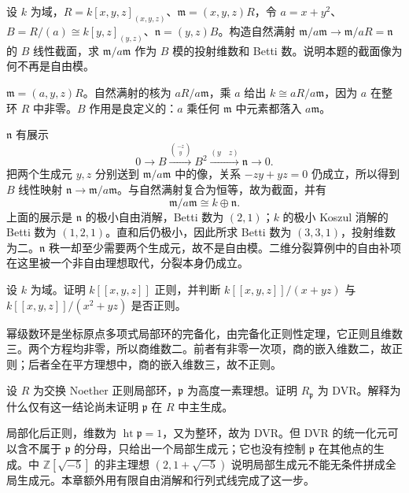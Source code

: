 \begin{exercise}\label{b3:ex:18-abs-splitting-concrete}
	设 \(k\) 为域，\(R=k[x,y,z]_{(x,y,z)}\)、\(\mathfrak m=(x,y,z)R\)，令 \(a=x+y^2\)、\(B=R/(a)\cong k[y,z]_{(y,z)}\)、\(\mathfrak n=(y,z)B\)。构造自然满射 \(\mathfrak m/a\mathfrak m\to\mathfrak m/aR=\mathfrak n\) 的 \(B\) 线性截面，求 \(\mathfrak m/a\mathfrak m\) 作为 \(B\) 模的投射维数和 Betti 数。说明本题的截面像为何不再是自由模。
\end{exercise}
\begin{solution}
	\(\mathfrak m=(a,y,z)R\)。自然满射的核为 \(aR/a\mathfrak m\)，乘 \(a\) 给出 \(k\cong aR/a\mathfrak m\)，因为 \(a\) 在整环 \(R\) 中非零。\(B\) 作用是良定义的：\(a\) 乘任何 \(\mathfrak m\) 中元素都落入 \(a\mathfrak m\)。

	\(\mathfrak n\) 有展示
	\[
		0\longrightarrow B\xrightarrow{\binom{-z}{y}}B^2 \xrightarrow{(y\quad z)}\mathfrak n\longrightarrow0.
	\]
	把两个生成元 \(y,z\) 分别送到 \(\mathfrak m/a\mathfrak m\) 中的像，关系 \(-zy+yz=0\) 仍成立，所以得到 \(B\) 线性映射 \(\mathfrak n\to\mathfrak m/a\mathfrak m\)。与自然满射复合为恒等，故为截面，并有
	\[
		\mathfrak m/a\mathfrak m\cong k\oplus\mathfrak n.
	\]
	上面的展示是 \(\mathfrak n\) 的极小自由消解，Betti 数为 \((2,1)\)；\(k\) 的极小 Koszul 消解的 Betti 数为 \((1,2,1)\)。直和后仍极小，因此所求 Betti 数为 \((3,3,1)\)，投射维数为二。\(\mathfrak n\) 秩一却至少需要两个生成元，故不是自由模。二维分裂算例中的自由补项在这里被一个非自由理想取代，分裂本身仍成立。
\end{solution}

\begin{exercise}\label{b3:ex:18-formal-regularity}
	设 \(k\) 为域。证明 \(k[\![x,y,z]\!]\) 正则，并判断 \(k[\![x,y,z]\!]/(x+yz)\) 与 \(k[\![x,y,z]\!]/(x^2+yz)\) 是否正则。
\end{exercise}
\begin{solution}
	幂级数环是坐标原点多项式局部环的完备化，由完备化正则性定理，它正则且维数三。两个方程均非零，所以商维数二。前者有非零一次项，商的嵌入维数二，故正则；后者全在平方理想中，商的嵌入维数三，故不正则。
\end{solution}

\begin{exercise}\label{b3:ex:18-localization-bases}
	设 \(R\) 为交换 Noether 正则局部环，\(\mathfrak p\) 为高度一素理想。证明 \(R_{\mathfrak p}\) 为 DVR。解释为什么仅有这一结论尚未证明 \(\mathfrak p\) 在 \(R\) 中主生成。
\end{exercise}
\begin{solution}
	局部化后正则，维数为 \(\operatorname{ht}\mathfrak p=1\)，又为整环，故为 DVR。但 DVR 的统一化元可以含不属于 \(\mathfrak p\) 的分母，只给出一个局部生成元；它也没有控制 \(\mathfrak p\) 在其他点的生成。中 \(\mathbb Z[\sqrt{-5}]\) 的非主理想 \((2,1+\sqrt{-5})\) 说明局部生成元不能无条件拼成全局生成元。本章额外用有限自由消解和行列式线完成了这一步。
\end{solution}

